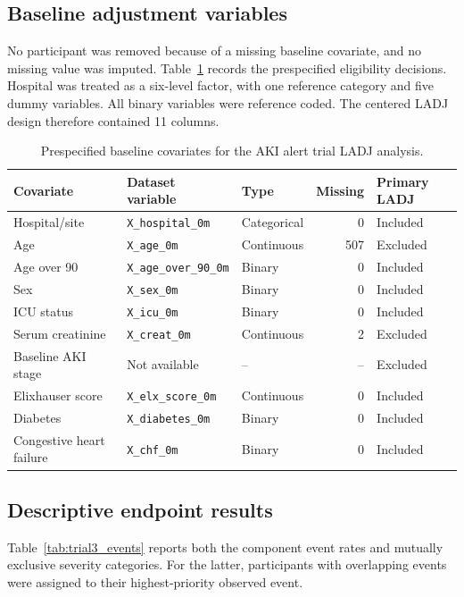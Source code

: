 \subsection{Baseline adjustment variables}

No participant was removed because of a missing baseline covariate, and no missing value
was imputed. Table~\ref{tab:trial3_covariates} records the prespecified eligibility
decisions. Hospital was treated as a six-level factor, with one reference category and five
dummy variables. All binary variables were reference coded. The centered LADJ design
therefore contained 11 columns.

\begin{table}[t]
\centering
\small
\caption{Prespecified baseline covariates for the AKI alert trial LADJ analysis.}
\label{tab:trial3_covariates}
\begin{tabular}{lllrl}
\toprule
Covariate & Dataset variable & Type & Missing & Primary LADJ \\
\midrule
Hospital/site & \texttt{X\_hospital\_0m} & Categorical & 0 & Included \\
Age & \texttt{X\_age\_0m} & Continuous & 507 & Excluded \\
Age over 90 & \texttt{X\_age\_over\_90\_0m} & Binary & 0 & Included \\
Sex & \texttt{X\_sex\_0m} & Binary & 0 & Included \\
ICU status & \texttt{X\_icu\_0m} & Binary & 0 & Included \\
Serum creatinine & \texttt{X\_creat\_0m} & Continuous & 2 & Excluded \\
Baseline AKI stage & Not available & -- & -- & Excluded \\
Elixhauser score & \texttt{X\_elx\_score\_0m} & Continuous & 0 & Included \\
Diabetes & \texttt{X\_diabetes\_0m} & Binary & 0 & Included \\
Congestive heart failure & \texttt{X\_chf\_0m} & Binary & 0 & Included \\
\bottomrule
\end{tabular}
\end{table}

\subsection{Descriptive endpoint results}

Table~\ref{tab:trial3_events} reports both the component event rates and mutually exclusive
severity categories. For the latter, participants with overlapping events were assigned to
their highest-priority observed event.

